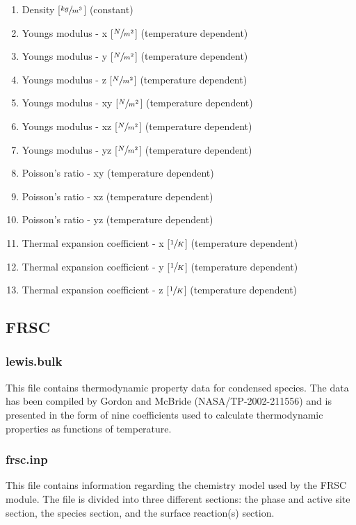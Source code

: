 \documentclass[]{article}
\begin{document}
\begin{enumerate}
	\item Density [\(\sfrac{kg}{m^3}\)] (constant)
	\item Youngs modulus - x [\(\sfrac{N}{m^2}\)] (temperature dependent)
	\item Youngs modulus - y [\(\sfrac{N}{m^2}\)] (temperature dependent)
	\item Youngs modulus - z [\(\sfrac{N}{m^2}\)] (temperature dependent)
	\item Youngs modulus - xy [\(\sfrac{N}{m^2}\)] (temperature dependent)
	\item Youngs modulus - xz [\(\sfrac{N}{m^2}\)] (temperature dependent)
	\item Youngs modulus - yz [\(\sfrac{N}{m^2}\)] (temperature dependent)
	\item Poisson's ratio - xy (temperature dependent)
	\item Poisson's ratio - xz (temperature dependent)
	\item Poisson's ratio - yz (temperature dependent)
	\item Thermal expansion coefficient - x [\(\sfrac{1}{K}\)] (temperature dependent)
	\item Thermal expansion coefficient - y [\(\sfrac{1}{K}\)] (temperature dependent)
	\item Thermal expansion coefficient - z [\(\sfrac{1}{K}\)] (temperature dependent)
\end{enumerate}
  
\subsection{FRSC}

\subsubsection{lewis.bulk}
This file contains thermodynamic property data for condensed species. The data has been compiled by Gordon and McBride (NASA/TP-2002-211556) and is presented in the form of nine coefficients used to calculate thermodynamic properties as functions of temperature.

\subsubsection{frsc.inp}
This file contains information regarding the chemistry model used by the FRSC module. The file is divided into three different sections: the phase and active site section, the species section, and the surface reaction(s) section.
\end{document}

